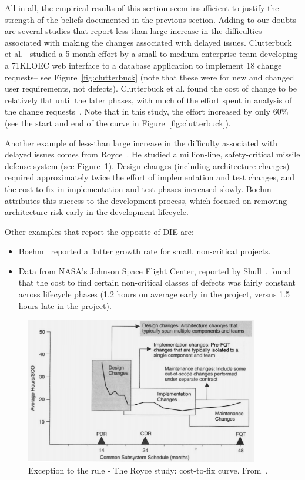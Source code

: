 \documentclass[smallcondesed]{svjour3}
\newcommand{\bi}{\begin{itemize}}%
\newcommand{\ei}{\end{itemize}}
\begin{document}
 All in all, the empirical results of this section seem insufficient to justify
 the strength of the beliefs documented in the previous section. Adding to our doubts are  several studies that report less-than large
 increase in the difficulties associated with making the changes associated with delayed
 issues. 
Clutterbuck et al.~\cite{Clutterbuck09} studied a 5-month effort by a small-to-medium enterprise team developing a 71KLOEC web interface to a database application to implement 18 change requests-- see Figure~\ref{fig:clutterbuck} (note that these were for new and changed user requirements, not defects). Clutterbuck et al. found the cost of change to be relatively flat until the later phases, with much of the effort spent in analysis of the change requests~\cite{Clutterbuck09}. Note that in this study, the effort increased by only 60\% (see the start and end of the curve in Figure~\ref{fig:clutterbuck}).




 
Another example of less-than large increase in the difficulty associated with delayed issues comes from  Royce~\cite{Royce98}. He
studied  a million-line, safety-critical missile defense system
(see  Figure~\ref{fig:royce}). Design changes (including architecture changes) required approximately twice the effort of implementation and test changes, and the cost-to-fix in implementation and test phases increased slowly. Boehm~\cite{Boehm10} attributes this success to the  development process, which focused on removing architecture risk early in the development lifecycle.
 
 Other examples that report the opposite of DIE are:
  \bi
  \item
  Boehm~\cite{Boehm80} reported a flatter growth rate for small, non-critical projects.
   \item 
  Data from NASA's Johnson Space Flight Center, reported by Shull~\cite{Shull02}, found that the cost to find certain non-critical classes of defects was fairly constant across lifecycle phases (1.2 hours on average early in the project, versus 1.5 hours late in the project). 
   
\ei


\begin{figure}
\begin{center}\includegraphics[width=4in]{img/Royce98.png}\end{center}
 \caption{Exception to the rule - The Royce study: cost-to-fix curve. From~\cite{Royce98}.}\label{fig:royce}
 \end{figure}
\end{document}
